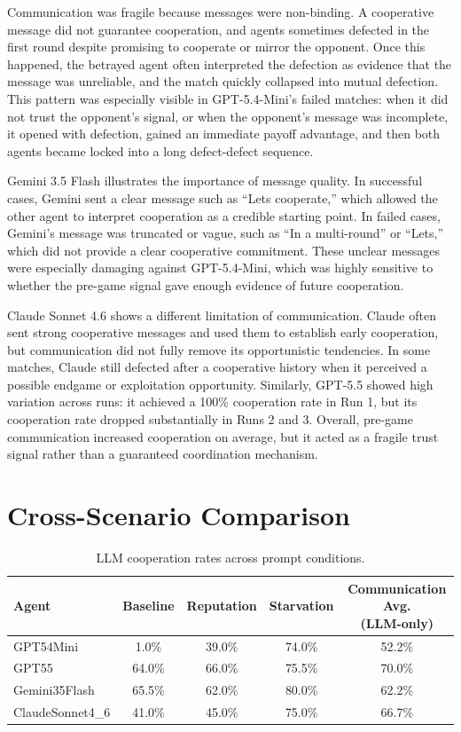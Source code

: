 \documentclass[11pt]{article}
\begin{document}
Communication was fragile because messages were non-binding. A cooperative message did not guarantee cooperation, and agents sometimes defected in the first round despite promising to cooperate or mirror the opponent. Once this happened, the betrayed agent often interpreted the defection as evidence that the message was unreliable, and the match quickly collapsed into mutual defection. This pattern was especially visible in GPT-5.4-Mini's failed matches: when it did not trust the opponent's signal, or when the opponent's message was incomplete, it opened with defection, gained an immediate payoff advantage, and then both agents became locked into a long defect-defect sequence.

Gemini 3.5 Flash illustrates the importance of message quality. In successful cases, Gemini sent a clear message such as ``Lets cooperate,'' which allowed the other agent to interpret cooperation as a credible starting point. In failed cases, Gemini's message was truncated or vague, such as ``In a multi-round'' or ``Lets,'' which did not provide a clear cooperative commitment. These unclear messages were especially damaging against GPT-5.4-Mini, which was highly sensitive to whether the pre-game signal gave enough evidence of future cooperation.

Claude Sonnet 4.6 shows a different limitation of communication. Claude often sent strong cooperative messages and used them to establish early cooperation, but communication did not fully remove its opportunistic tendencies. In some matches, Claude still defected after a cooperative history when it perceived a possible endgame or exploitation opportunity. Similarly, GPT-5.5 showed high variation across runs: it achieved a 100\% cooperation rate in Run 1, but its cooperation rate dropped substantially in Runs 2 and 3. Overall, pre-game communication increased cooperation on average, but it acted as a fragile trust signal rather than a guaranteed coordination mechanism.


\section{Cross-Scenario Comparison}

\begin{table}[H]
\centering
\caption{LLM cooperation rates across prompt conditions.}
\label{tab:cross_scenario_coop}
\small
\begin{tabular}{lcccc}
\toprule
Agent & Baseline & Reputation & Starvation & \makecell{Communication Avg.\\(LLM-only)} \\
\midrule
GPT54Mini & 1.0\% & 39.0\% & 74.0\% & 52.2\% \\
GPT55 & 64.0\% & 66.0\% & 75.5\% & 70.0\% \\
Gemini35Flash & 65.5\% & 62.0\% & 80.0\% & 62.2\% \\
ClaudeSonnet4\_6 & 41.0\% & 45.0\% & 75.0\% & 66.7\% \\
\bottomrule
\end{tabular}
\end{table}
\end{document}
